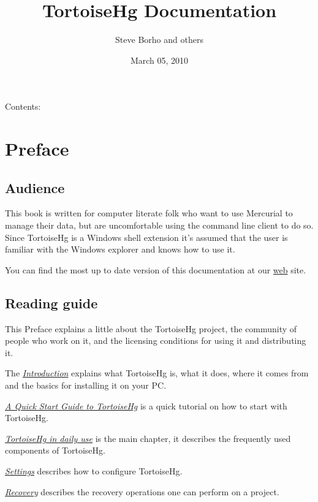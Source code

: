 \documentclass[letterpaper,10pt,english]{manual}
\title{TortoiseHg Documentation}
\date{March 05, 2010}
\author{Steve Borho and others}
\begin{document}
\maketitle
\tableofcontents



Contents:

\resetcurrentobjects
\hypertarget{--doc-preface}{}

\chapter{Preface}
\hypertarget{module-preface}{}

\section{Audience}

This book is written for computer literate folk who want to use
Mercurial to manage their data, but are uncomfortable using the command
line client to do so. Since TortoiseHg is a Windows shell extension it's
assumed that the user is familiar with the Windows explorer and knows
how to use it.

You can find the most up to date version of this documentation at our
\href{http://tortoisehg.org}{web} site.


\section{Reading guide}

This Preface explains a little about the TortoiseHg project, the
community of people who work on it, and the licensing conditions for
using it and distributing it.

The \hyperlink{--doc-intro}{\emph{Introduction}} explains what TortoiseHg is, what it does, where it
comes from and the basics for installing it on your PC.

\hyperlink{--doc-quick}{\emph{A Quick Start Guide to TortoiseHg}} is a quick tutorial on how to start with TortoiseHg.

\hyperlink{--doc-daily}{\emph{TortoiseHg in daily use}} is the main chapter, it describes the frequently used
components of TortoiseHg.

\hyperlink{--doc-settings}{\emph{Settings}} describes how to configure TortoiseHg.

\hyperlink{--doc-recovery}{\emph{Recovery}} describes the recovery operations one can perform on a
project.
\end{document}
